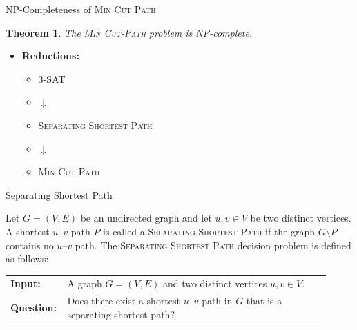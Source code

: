 \documentclass [xcolor=svgnames, t] {beamer}
\newtheorem{thm}{Theorem}[section]
\begin{document}
\begin{frame}{NP-Completeness of \textsc{Min Cut Path}}
\vspace{-0.7em}
\begin{thm}
The \textsc{Min Cut-Path} problem is NP-complete. 
\end{thm}

\vspace{0.2em}
\begin{itemize}
    \item \textbf{Reductions:}
    \begin{itemize}
        \item \textsc{3-SAT}
        \item $\downarrow$
        \item \textsc{Separating Shortest Path}
        \item $\downarrow$
        \item \textsc{Min Cut Path}
    \end{itemize}
\end{itemize}
\end{frame}

\begin{frame}{Separating Shortest Path}
\begin{problem}
Let $G = (V,E)$ be an undirected graph and let $u,v \in V$ be two distinct vertices.  
A shortest $u$--$v$ path $P$ is called a \textsc{Separating Shortest Path} if the graph $G \setminus P$ contains no $u$--$v$ path.  
The \textsc{Separating Shortest Path} decision problem is defined as follows:

\begin{center}
\begin{tabular}{p{0.12\linewidth}p{0.8\linewidth}}
\textbf{Input:} & A graph $G = (V,E)$ and two distinct vertices $u,v \in V$.\\
\textbf{Question:} & Does there exist a shortest $u$--$v$ path in $G$ that is a separating shortest path?
\end{tabular}
\end{center}
\end{problem}
    
\end{frame}
\end{document}
